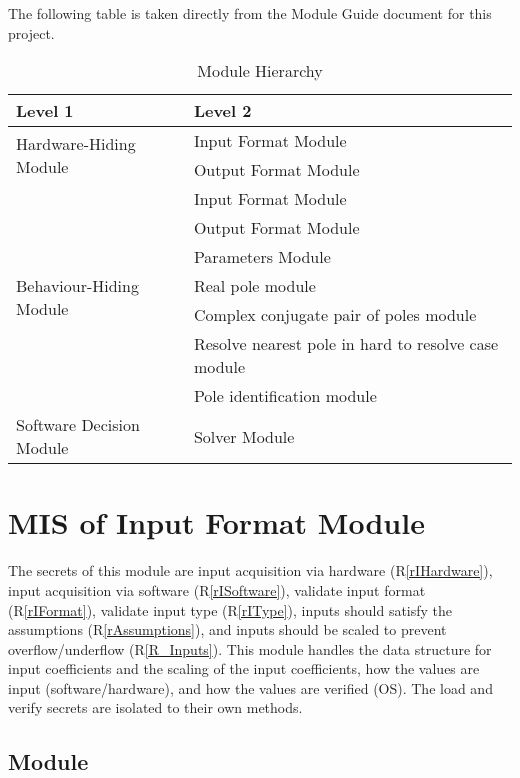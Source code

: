 \documentclass[12pt, titlepage]{article}
\newcommand{\rref}[1]{(R\ref{#1})}
\begin{document}
The following table is taken directly from the Module Guide document for this project.

\begin{table}[h!]
\centering
\begin{tabular}{p{} p{}}
\toprule
\textbf{Level 1} & \textbf{Level 2}\\
\midrule

\multirow{2}{0.3\textwidth}{Hardware-Hiding Module}
  & Input Format Module\\
  & Output Format Module \\

\midrule

\multirow{7}{0.3\textwidth}{Behaviour-Hiding Module}
  & Input Format Module\\
  & Output Format Module \\
  & Parameters Module\\
  & Real pole module\\
  & Complex conjugate pair of poles module\\ 
  & Resolve nearest pole in hard to resolve case module\\
  & Pole identification module\\
\midrule

{Software Decision Module} & Solver Module\\
\bottomrule

\end{tabular}
\caption{Module Hierarchy}
\label{tb:module}
\end{table}

\section{MIS of Input Format Module} \label{sc:MIS_IN}

The secrets of this module are
 input acquisition via hardware \rref{rIHardware},
 input acquisition via software \rref{rISoftware},
 validate input format \rref{rIFormat},
 validate input type \rref{rIType},
 inputs should satisfy the assumptions \rref{rAssumptions}, and
 inputs should be scaled to prevent overflow/underflow \rref{R_Inputs}.
This module handles the data structure for input coefficients and the scaling of
 the input coefficients, how the values are input (software/hardware),
 and how the values are verified (OS).
The load and verify secrets are isolated to their own methods.

\subsection{Module}
\end{document}

